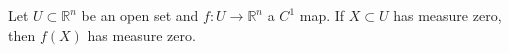 Let $U \subset \mathbb{R}^n$ be an open set and $f: U \to \mathbb{R}^n$ a $C^1$ map. If $X \subset U$ has measure zero, then $f(X)$ has measure zero.
